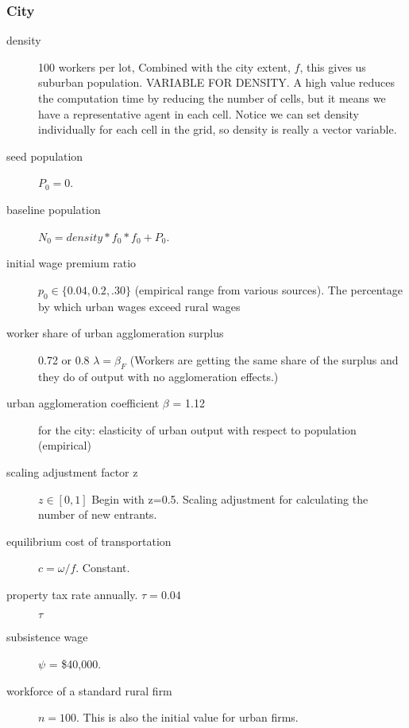 \subsubsection{City}
\begin{description}
\item [density] 100 workers per lot, Combined with the city extent, $f$, this gives us suburban population. VARIABLE FOR DENSITY. A high value reduces the computation time by reducing the number of cells, but it means we have a representative agent in  each cell. Notice we can set density individually for each cell in the grid, so density is really a vector variable.  %
\item [seed population] $P_0=0$. %
\item [baseline population] $N_0=density * f_0 * f_0 + P_0$.

\item [initial wage premium ratio] $p_0\in\{0.04,0.2,.30\}$ (empirical range from various sources). The percentage by which urban wages exceed rural wages 
\item [worker share of urban agglomeration surplus] 0.72 or 0.8 $\lambda=\beta_F$ (Workers are getting the same share of the surplus and they do of output with no agglomeration effects.)
\item [urban agglomeration coefficient $\beta$ = 1.12] for the city: elasticity of urban output with respect to population (empirical)

\item [scaling adjustment factor z] $z\in[0,1]$ Begin with z=0.5. Scaling adjustment for calculating the number of new entrants. 

\item [equilibrium cost of transportation] $c = \omega/f$. Constant.
\item [property tax rate annually. $\tau=0.04$] $\tau$ 
\item [subsistence wage] $\psi$ = \$40,000. %
\item [workforce of a standard rural firm] $n=100$. This is also the initial value for urban firms.
\end{description}


